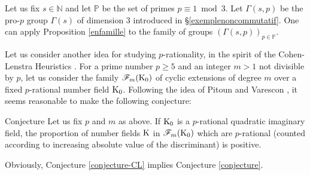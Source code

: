 \documentclass[12pt,a4paper,twoside,english]{smfart}
\def\K{{\rm K}}
\def\Q{{\mathbb Q}}
\def\Nat{{\mathbb N}}
\def\PP{{\mathbb P}}
\def\Ff{{\mathcal F}}
\def\Gal{{\rm Gal}}
\newenvironment{conjecture}{\begin{enonce}{Conjecture}}{\end{enonce}}
\begin{document}
\begin{exem} Let us fix $s\in \Nat$ and let $\PP$ be the set of primes $p \equiv 1 \bmod 3$.  Let $\Gamma(s,p)$ be the pro-$p$ group $\Gamma(s)$ of dimension $3$ introduced in \S \ref{exemplenoncommutatif}.
One can apply Proposition \ref{enfamille} to the family of groups $\left(\Gamma(s,p)\right)_{p\in \PP}$.
\end{exem}

\medskip

Let us consider another idea for studying $p$-rationality, in the spirit of the Cohen-Lenstra Heuristics \cite{Cohen-Lenstra}.
For a prime number $p\geq 5$ and an integer $m>1$ not divisible by $p$,  let us consider the family $\Ff_m(\K_0)$ of cyclic extensions of degree $m$ over a fixed $p$-rational number field $\K_0$.
 Following the idea of Pitoun and Varescon \cite{Pitoun-Varescon}, it seems reasonable to make the following conjecture:

 \begin{conjecture}\label{conjecture-CL} 
 Let us fix $p$ and $m$ as above.
 If $\K_0$ is a $p$-rational quadratic imaginary field,  
 the proportion of  number fields $\K$ in $\Ff_{m}(\K_0)$ which are $p$-rational (counted according to increasing absolute value
of the discriminant) is positive.
\end{conjecture}

Obviously, Conjecture \ref{conjecture-CL} implies Conjecture \ref{conjecture}.


\end{document}
